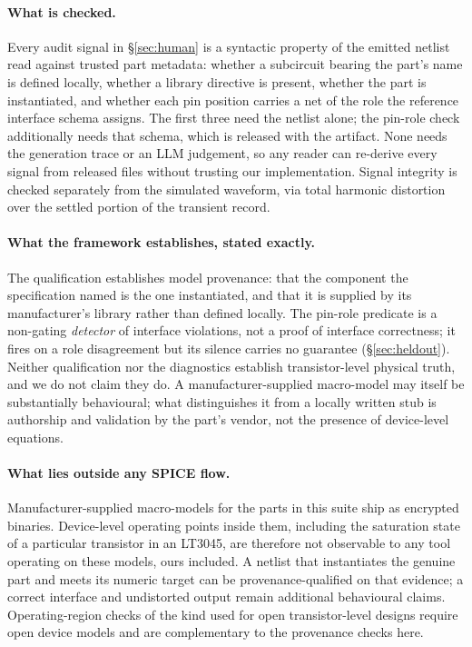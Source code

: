\paragraph{What is checked.}
Every audit signal in \S\ref{sec:human} is a syntactic property of the
emitted netlist read against trusted part metadata: whether a subcircuit
bearing the part's name is defined locally, whether a library directive is
present, whether the part is instantiated, and whether each pin position
carries a net of the role the reference interface schema assigns. The first
three need the netlist alone; the pin-role check additionally needs that
schema, which is released with the artifact. None needs the generation trace
or an LLM judgement, so any reader can re-derive every signal from released
files without trusting our implementation. Signal integrity is checked separately from the simulated
waveform, via total harmonic distortion over the settled portion of the
transient record.

\paragraph{What the framework establishes, stated exactly.}
The qualification establishes model provenance: that the component the specification
named is the one instantiated, and that it is supplied by its manufacturer's
library rather than defined locally. The pin-role predicate is a non-gating
\emph{detector} of interface violations, not a proof of interface
correctness; it fires on a role disagreement but its silence carries no
guarantee (\S\ref{sec:heldout}). Neither qualification nor the diagnostics establish
transistor-level physical truth, and we do not claim they do. A
manufacturer-supplied macro-model may itself be substantially behavioural;
what distinguishes it from a locally written stub is authorship and
validation by the part's vendor, not the presence of device-level equations.

\paragraph{What lies outside any SPICE flow.}
Manufacturer-supplied macro-models for the parts in this suite ship as
encrypted binaries. Device-level operating points inside them, including the
saturation state of a particular transistor in an LT3045, are therefore not
observable to any tool operating on these models, ours included. A netlist
that instantiates the genuine part and meets its numeric target can be
provenance-qualified on that evidence; a correct interface and undistorted
output remain additional behavioural claims. Operating-region checks of
the kind used for open transistor-level designs require open device models
and are complementary to the provenance checks here.


